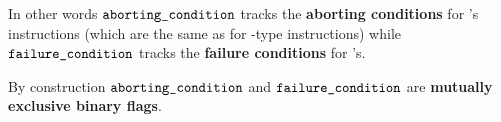 \begin{description}
		\saNote{}
		In other words
		$\texttt{aborting\_condition}$ tracks the \textbf{aborting conditions} for 's instructions (which are the same as for -type instructions) while
		$\texttt{failure\_condition}$  tracks the \textbf{failure conditions} for 's.

		\saNote{}
		By construction $\texttt{aborting\_condition}$ and $\texttt{failure\_condition}$ are \textbf{mutually exclusive binary flags}.
\end{description}
